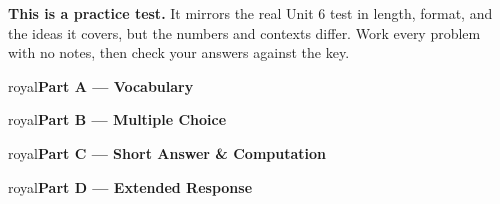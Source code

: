 \documentclass[10pt]{article}
\newcommand{\parthead}[1]{%
  \vspace{6pt}\noindent
  \begin{headlinebox}{royal}{\color{white}\bfseries #1}\end{headlinebox}%
  \vspace{4pt}}
\begin{document}
\namedateperiod

\vspace{0.10in}
\begin{remindbox}
\small
\textbf{This is a practice test.} It mirrors the real Unit 6 test in length, format,
and the ideas it covers, but the numbers and contexts differ. Work every problem
with no notes, then check your answers against the key.
\end{remindbox}

\parthead{Part A --- Vocabulary}

\parthead{Part B --- Multiple Choice}

\parthead{Part C --- Short Answer \& Computation}

\parthead{Part D --- Extended Response}
\end{document}
